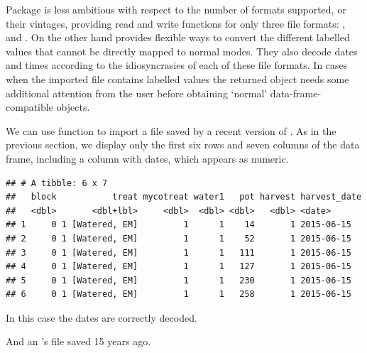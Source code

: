 \documentclass[krantz2]{krantz}\usepackage{knitr}%
\begin{document}
Package  is less ambitious with respect to the number of formats supported, or their vintages, providing read and write functions for only three file formats: ,  and . On the other hand  provides flexible ways to convert the different labelled values that cannot be directly mapped to normal \Rlang modes. They also decode dates and times according to the idiosyncrasies of each of these file formats. In cases when the imported file contains labelled values the returned  object needs some additional attention from the user before obtaining `normal' data-frame-compatible  objects.

We can use function  to import a  file saved by a recent version of . As in the previous section, we display only the first six rows and seven columns of the data frame, including a column with dates, which appears as numeric.

\begin{knitrout}\footnotesize
{}\color{fgcolor}\begin{kframe}
\begin{alltt}
 \hlkwb{<-} \hlstd{(} \hlstd{=} \hlstd{)}
\hlstd{my_spss.tb[}\hlopt{:}\hlstd{,} \hlstd{(}\hlopt{:}\hlstd{,} \hlstd{)]}
\end{alltt}
\begin{verbatim}
## # A tibble: 6 x 7
##   block           treat mycotreat water1   pot harvest harvest_date
##   <dbl>       <dbl+lbl>     <dbl>  <dbl> <dbl>   <dbl> <date>      
## 1     0 1 [Watered, EM]         1      1    14       1 2015-06-15  
## 2     0 1 [Watered, EM]         1      1    52       1 2015-06-15  
## 3     0 1 [Watered, EM]         1      1   111       1 2015-06-15  
## 4     0 1 [Watered, EM]         1      1   127       1 2015-06-15  
## 5     0 1 [Watered, EM]         1      1   230       1 2015-06-15  
## 6     0 1 [Watered, EM]         1      1   258       1 2015-06-15
\end{verbatim}
\end{kframe}
\end{knitrout}

In this case the dates are correctly decoded.

And an 's  file saved 15 years ago.
\end{document}
